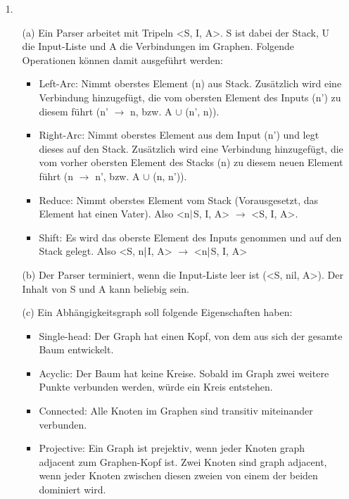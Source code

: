 \documentclass[ngerman]{fbi-aufgabenblatt}
\begin{document}

\begin{itemize}
	\item[1.] 
	\begin{itemize}
		\item[(a)] Ein Parser arbeitet mit Tripeln <S, I, A>. S ist dabei der Stack, U die Input-Liste und A die Verbindungen im Graphen. Folgende Operationen können damit ausgeführt werden:
		\begin{itemize}
			\item Left-Arc: Nimmt oberstes Element (n) aus Stack. Zusätzlich wird eine Verbindung hinzugefügt, die vom obersten Element des Inputs (n') zu diesem führt (n' 						\(\rightarrow\)  n, bzw. A \(\cup\) {(n', n)}).
			\item Right-Arc: Nimmt oberstes Element aus dem Input (n') und legt dieses auf den Stack. Zusätzlich wird eine Verbindung hinzugefügt, die vom vorher obersten Element des 				Stacks (n) zu diesem neuen Element führt (n \(\rightarrow\) n', bzw. A \(\cup\) {(n, n')}).
			\item  Reduce: Nimmt oberstes Element vom Stack (Vorausgesetzt, das Element hat einen Vater). Also <n\(\arrowvert\)S, I, A> \(\rightarrow\) <S, I, A>.
			\item Shift: Es wird das oberste Element des Inputs genommen und auf den Stack gelegt. Also <S, n\(\arrowvert\)I, A> \(\rightarrow\) <n\(\arrowvert\)S, I, A>
		\end{itemize}
		\item[(b)] Der Parser terminiert, wenn die Input-Liste leer ist (<S, nil, A>). Der Inhalt von S und A kann beliebig sein.
		\item[(c)] Ein Abhängigkeitsgraph soll folgende Eigenschaften haben:
		\begin{itemize}
			\item Single-head: Der Graph hat einen Kopf, von dem aus sich der gesamte Baum entwickelt.
			\item Acyclic: Der Baum hat keine Kreise. Sobald im Graph zwei weitere Punkte verbunden werden, würde ein Kreis entstehen.
			\item Connected: Alle Knoten im Graphen sind transitiv miteinander verbunden.
			\item Projective: Ein Graph ist prejektiv, wenn jeder Knoten \glqq graph adjacent\grqq{} zum Graphen-Kopf ist. Zwei Knoten sind \glqq graph adjacent\grqq{}, wenn jeder 					Knoten zwischen diesen zweien von einem der beiden dominiert wird.
		\end{itemize}

\end{itemize}
\end{itemize}
\end{document}
